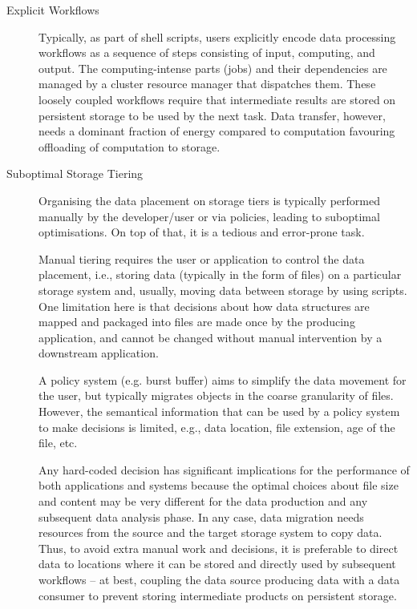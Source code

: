 \documentclass[a4paper]{article}
\begin{document}
\begin{description}
\item[Explicit Workflows]

Typically, as part of shell scripts, users explicitly encode data processing workflows as a sequence of steps consisting of input, computing, and output.
The computing-intense parts (jobs) and their dependencies are managed by a cluster resource manager that dispatches them.
These loosely coupled workflows require that intermediate results are stored on persistent storage to be used by the next task.
Data transfer, however, needs a dominant fraction of energy compared to computation favouring offloading of computation to storage.

\item[Suboptimal Storage Tiering]

Organising the data placement on storage tiers is typically performed manually by the developer/user or via policies, leading to suboptimal optimisations. On top of that, it is a tedious and error-prone task.

Manual tiering requires the user or application to control the data placement, i.e., storing data (typically in the form of files) on a particular storage system and, usually, moving data between storage by using scripts.
One limitation here is that decisions about how data structures are mapped and packaged into files are made once by the producing application, and cannot be changed without manual intervention by a downstream application.

A policy system (e.g. burst buffer) aims to simplify the data movement for the user, but typically migrates objects in the coarse granularity of files.
However, the semantical information that can be used by a policy system to make decisions is limited, e.g., data location, file extension, age of the file, etc.

Any hard-coded decision has significant implications for the performance of both applications and systems because the optimal choices about file size and content may be very different for the data production and any subsequent data analysis phase.
In any case, data migration needs resources from the source and the target storage system to copy data.
Thus, to avoid extra manual work and decisions, it is preferable to direct data to locations where it can be stored and directly used by subsequent workflows -- at best, coupling the data source producing data with a data consumer to prevent storing intermediate products on persistent storage.


\end{description}
\end{document}

